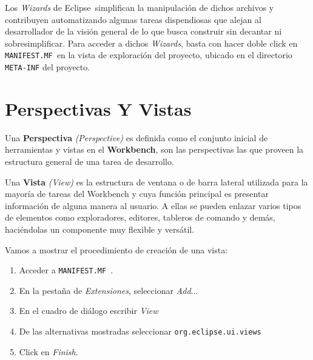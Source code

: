 \documentclass[journal]{IEEEtran}
\newcommand{\eclp}{\textsf{Eclipse~}}
\newcommand{\mnf}{\texttt{MANIFEST.MF~}}
\begin{document}
Los \textit{Wizards} de \eclp simplifican la manipulación de dichos archivos y contribuyen 
automatizando algunas tareas dispendiosas que alejan al desarrollador de la visión general de lo que busca construir sin decantar 
ni sobresimplificar.
Para acceder a dichos \textit{Wizards}, basta con hacer doble click en \mnf en la vista de exploración del proyecto, ubicado en el 
directorio \texttt{META-INF} del proyecto.

\section{Perspectivas Y Vistas}
Una \textbf{Perspectiva} \cite{SiVl} \textit{(Perspective)} es definida como el conjunto inicial de herramientas y vistas en el \textbf{Workbench}, son las 
perspectivas las que proveen la estructura general de una tarea de desarrollo.

Una \textbf{Vista}\cite{SiVl} \textit{(View)} es la estructura de ventana o de barra lateral utilizada para la mayoría de tareas del Workbench 
y cuya función principal es presentar información de alguna manera al usuario. A ellas se pueden enlazar varios tipos de 
elementos como exploradores, editores, tableros de comando y demás, haciéndolas un componente muy flexible y versátil.

Vamos a mostrar el procedimiento de creación de una vista:
\begin{enumerate}
\item Acceder a \mnf.
\item En la pestaña de \textit{Extensiones}, seleccionar \textit{Add}...
\item En el cuadro de diálogo escribir \textit{View}
\item De las alternativas mostradas seleccionar \texttt{org.eclipse.ui.views}
\item Click en \textit{Finish}.
\end{enumerate}
\end{document}
